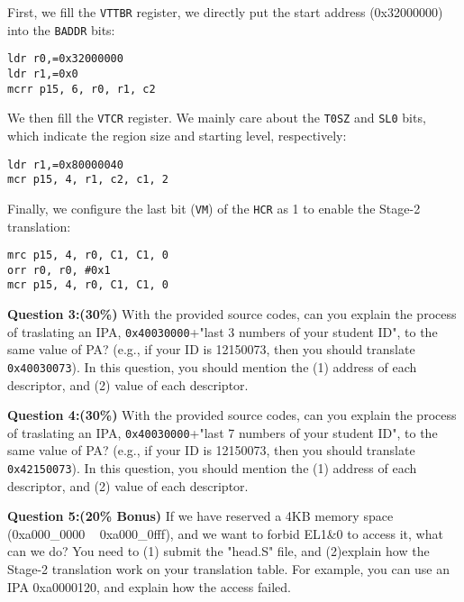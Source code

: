 First, we fill the \texttt{VTTBR} register, we directly put the start address (0x32000000) into the \texttt{BADDR} bits:

\begin{lstlisting}
ldr r0,=0x32000000
ldr r1,=0x0
mcrr p15, 6, r0, r1, c2
\end{lstlisting}


We then fill the \texttt{VTCR} register. We mainly care about the \texttt{T0SZ} and \texttt{SL0} bits, which indicate the region size and starting level, respectively:

\begin{lstlisting}
ldr r1,=0x80000040
mcr p15, 4, r1, c2, c1, 2
\end{lstlisting}

Finally, we configure the last bit (\texttt{VM}) of the \texttt{HCR} as 1 to enable the Stage-2 translation:

\begin{lstlisting}
mrc p15, 4, r0, C1, C1, 0 
orr	r0, r0, #0x1
mcr p15, 4, r0, C1, C1, 0
\end{lstlisting}

\textbf{Question 3:(30\%)} With the provided source codes, can you 
explain 
the process of traslating an IPA, \texttt{0x40030000}+"last 3 numbers 
of your student ID", to the same value of PA? (e.g., if your ID is 
12150073, then you should translate \texttt{0x40030073}).
In this question, you should mention the (1) address of each 
descriptor, and (2) value of each descriptor. 

\textbf{Question 4:(30\%)} With the provided source codes, can you 
explain 
the process of traslating an IPA, \texttt{0x40030000}+"last 7 numbers 
of your student ID", to the same value of PA? (e.g., if your ID is 
12150073, then you should translate \texttt{0x42150073}).
In this question, you should mention the (1) address of each 
descriptor, and (2) value of each descriptor.

\textbf{Question 5:(20\% Bonus)} If we have reserved a 4KB memory space (0xa000\_0000 ~ 0xa000\_0fff), and we
want to forbid EL1\&0 to access it, what can we do? You need to (1) submit the "head.S" file, and (2)explain how the Stage-2 translation work on your translation table. For example, you can use an IPA 0xa0000120, and explain how the access failed.



